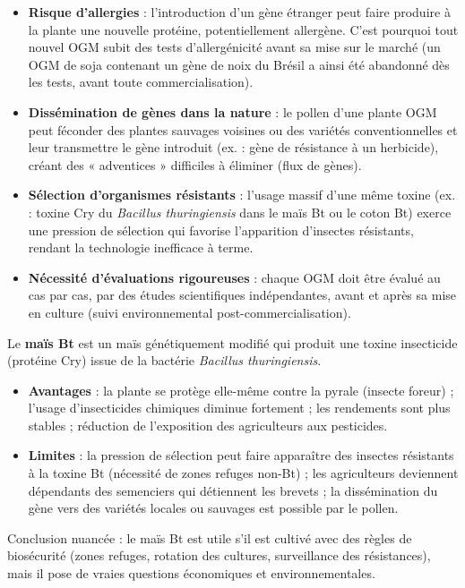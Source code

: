 \documentclass[11pt]{article}
\begin{document}
\begin{itemize}
\item \textbf{Risque d'allergies} : l'introduction d'un gène étranger peut faire produire à la plante une nouvelle protéine, potentiellement allergène. C'est pourquoi tout nouvel OGM subit des tests d'allergénicité avant sa mise sur le marché (un OGM de soja contenant un gène de noix du Brésil a ainsi été abandonné dès les tests, avant toute commercialisation).
\item \textbf{Dissémination de gènes dans la nature} : le pollen d'une plante OGM peut féconder des plantes sauvages voisines ou des variétés conventionnelles et leur transmettre le gène introduit (ex. : gène de résistance à un herbicide), créant des « adventices » difficiles à éliminer (flux de gènes).
\item \textbf{Sélection d'organismes résistants} : l'usage massif d'une même toxine (ex. : toxine Cry du \emph{Bacillus thuringiensis} dans le maïs Bt ou le coton Bt) exerce une pression de sélection qui favorise l'apparition d'insectes résistants, rendant la technologie inefficace à terme.
\item \textbf{Nécessité d'évaluations rigoureuses} : chaque OGM doit être évalué au cas par cas, par des études scientifiques indépendantes, avant et après sa mise en culture (suivi environnemental post-commercialisation).
\end{itemize}

\begin{exemplebox}
Le \textbf{maïs Bt} est un maïs génétiquement modifié qui produit une toxine insecticide (protéine Cry) issue de la bactérie \emph{Bacillus thuringiensis}.
\begin{itemize}
\item \textbf{Avantages} : la plante se protège elle-même contre la pyrale (insecte foreur) ; l'usage d'insecticides chimiques diminue fortement ; les rendements sont plus stables ; réduction de l'exposition des agriculteurs aux pesticides.
\item \textbf{Limites} : la pression de sélection peut faire apparaître des insectes résistants à la toxine Bt (nécessité de zones refuges non-Bt) ; les agriculteurs deviennent dépendants des semenciers qui détiennent les brevets ; la dissémination du gène vers des variétés locales ou sauvages est possible par le pollen.
\end{itemize}
Conclusion nuancée : le maïs Bt est utile s'il est cultivé avec des règles de biosécurité (zones refuges, rotation des cultures, surveillance des résistances), mais il pose de vraies questions économiques et environnementales.
\end{exemplebox}
\end{document}
